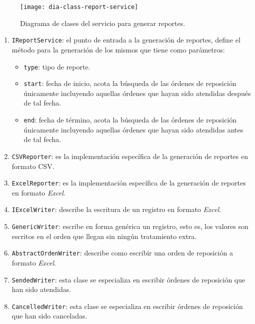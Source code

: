 \begin{figure}[h]
	\centering
	\texttt{[image: dia-class-report-service]}
	\caption{Diagrama de clases del servicio para generar reportes.}
	\label{fig:dia-class-report-service}
\end{figure}

\begin{enumerate}
	\item \texttt{IReportService}: el punto de entrada a la generación de reportes, define el método para la generación de los mismos que tiene como parámetros:
	\begin{itemize}
	 	\item \texttt{type}: tipo de reporte.
	 	\item \texttt{start}: fecha de inicio, acota la búsqueda de las órdenes de reposición únicamente incluyendo aquellas órdenes que hayan sido atendidas después de tal fecha.
	 	\item \texttt{end}: fecha de término, acota la búsqueda de las órdenes de reposición únicamente incluyendo aquellas órdenes que hayan sido atendidas antes de tal fecha.
	 \end{itemize}
	\item \texttt{CSVReporter}: es la implementación específica de la generación de reportes en formato CSV.
	\item \texttt{ExcelReporter}: es la implementación específica de la generación de reportes en formato \textit{Excel}\textsuperscript{\textcopyright}.
	\item \texttt{IExcelWriter}: describe la escritura de un registro en formato \textit{Excel}\textsuperscript{\textcopyright}.
	\item \texttt{GenericWriter}: escribe en forma genérica un registro, esto es, los valores son escritos en el orden que llegan sin ningún tratamiento extra. 
	\item \texttt{AbstractOrdenWriter}: describe como escribir una orden de reposición a formato \textit{Excel}\textsuperscript{\textcopyright}.
	\item \texttt{SendedWriter}: esta clase se especializa en escribir órdenes de reposición que han sido atendidas.
	\item \texttt{CancelledWriter}: esta clase se especializa en escribir órdenes de reposición que han sido canceladas.
\end{enumerate}



